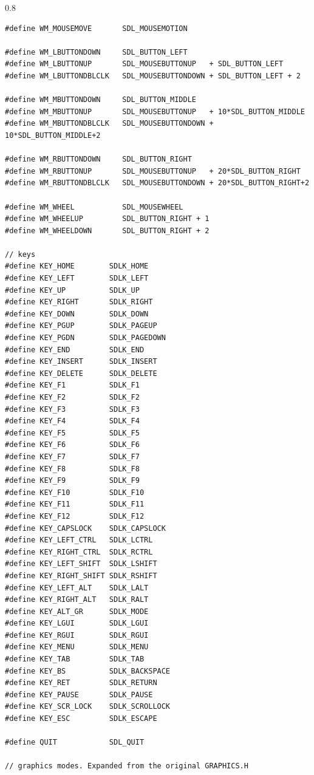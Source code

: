 \documentclass[a4paper,12pt]{article}
\newenvironment{margins}[2]
{ %
\begin{list}{}
{
\setlength{\leftmargin}{#1}
\setlength{\rightmargin}{#2}
} \item
} %
{\end{list}}
\begin{document}
\begin{margins}{-0.5cm}{-0.5cm}
\begin{spacing}{0.8}
\begin{lstlisting}
#define WM_MOUSEMOVE       SDL_MOUSEMOTION

#define WM_LBUTTONDOWN     SDL_BUTTON_LEFT
#define WM_LBUTTONUP       SDL_MOUSEBUTTONUP   + SDL_BUTTON_LEFT
#define WM_LBUTTONDBLCLK   SDL_MOUSEBUTTONDOWN + SDL_BUTTON_LEFT + 2

#define WM_MBUTTONDOWN     SDL_BUTTON_MIDDLE
#define WM_MBUTTONUP       SDL_MOUSEBUTTONUP   + 10*SDL_BUTTON_MIDDLE
#define WM_MBUTTONDBLCLK   SDL_MOUSEBUTTONDOWN + 10*SDL_BUTTON_MIDDLE+2

#define WM_RBUTTONDOWN     SDL_BUTTON_RIGHT
#define WM_RBUTTONUP       SDL_MOUSEBUTTONUP   + 20*SDL_BUTTON_RIGHT
#define WM_RBUTTONDBLCLK   SDL_MOUSEBUTTONDOWN + 20*SDL_BUTTON_RIGHT+2

#define WM_WHEEL           SDL_MOUSEWHEEL
#define WM_WHEELUP         SDL_BUTTON_RIGHT + 1
#define WM_WHEELDOWN       SDL_BUTTON_RIGHT + 2

// keys
#define KEY_HOME        SDLK_HOME
#define KEY_LEFT        SDLK_LEFT
#define KEY_UP          SDLK_UP
#define KEY_RIGHT       SDLK_RIGHT
#define KEY_DOWN        SDLK_DOWN
#define KEY_PGUP        SDLK_PAGEUP
#define KEY_PGDN        SDLK_PAGEDOWN
#define KEY_END         SDLK_END
#define KEY_INSERT      SDLK_INSERT
#define KEY_DELETE      SDLK_DELETE
#define KEY_F1          SDLK_F1
#define KEY_F2          SDLK_F2
#define KEY_F3          SDLK_F3
#define KEY_F4          SDLK_F4
#define KEY_F5          SDLK_F5
#define KEY_F6          SDLK_F6
#define KEY_F7          SDLK_F7
#define KEY_F8          SDLK_F8
#define KEY_F9          SDLK_F9
#define KEY_F10         SDLK_F10
#define KEY_F11         SDLK_F11
#define KEY_F12         SDLK_F12
#define KEY_CAPSLOCK    SDLK_CAPSLOCK
#define KEY_LEFT_CTRL   SDLK_LCTRL
#define KEY_RIGHT_CTRL  SDLK_RCTRL
#define KEY_LEFT_SHIFT  SDLK_LSHIFT
#define KEY_RIGHT_SHIFT SDLK_RSHIFT
#define KEY_LEFT_ALT    SDLK_LALT
#define KEY_RIGHT_ALT   SDLK_RALT
#define KEY_ALT_GR      SDLK_MODE
#define KEY_LGUI        SDLK_LGUI
#define KEY_RGUI        SDLK_RGUI
#define KEY_MENU        SDLK_MENU
#define KEY_TAB         SDLK_TAB
#define KEY_BS          SDLK_BACKSPACE
#define KEY_RET         SDLK_RETURN
#define KEY_PAUSE       SDLK_PAUSE
#define KEY_SCR_LOCK    SDLK_SCROLLOCK
#define KEY_ESC         SDLK_ESCAPE

#define QUIT            SDL_QUIT

// graphics modes. Expanded from the original GRAPHICS.H


\end{lstlisting}
\end{spacing}
\end{margins}
\end{document}
